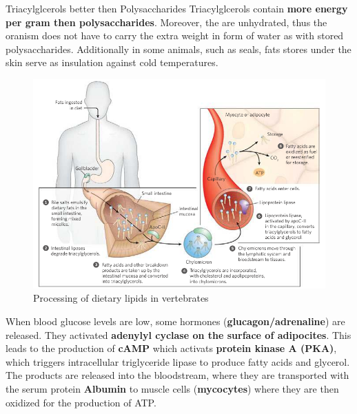 \documentclass[../main.tex]{subfiles}
\begin{document}
\begin{RemarkWithTitel}{Triacylglcerols better then Polysaccharides}
	Triacylglcerols contain \textbf{more energy per gram then polysaccharides}. Moreover, the are unhydrated, thus the oranism does not have to carry the extra weight in form of water as with stored polysaccharides. Additionally in some animals, such as seals, fats stores under the skin serve as insulation against cold temperatures. 
\end{RemarkWithTitel}
\begin{figure}[H]
	\centering
	\includegraphics[width = 0.8 \textwidth]{FA0_2}
	\caption{Processing of dietary lipids in vertebrates}
\end{figure}
\noindent
When blood glucose levels are low, some hormones (\textbf{glucagon/adrenaline}) are released. They activated \textbf{adenylyl cyclase on the surface of adipocites}. This leads to the production of \textbf{cAMP} which activats \textbf{protein kinase A (PKA)}, which triggers intracellular triglyceride lipase to produce fatty acids and glycerol. The products are released into the bloodstream, where they are transported with the serum protein \textbf{Albumin} to muscle cells (\textbf{mycocytes}) where they are then oxidized for the production of ATP. 
\end{document}
